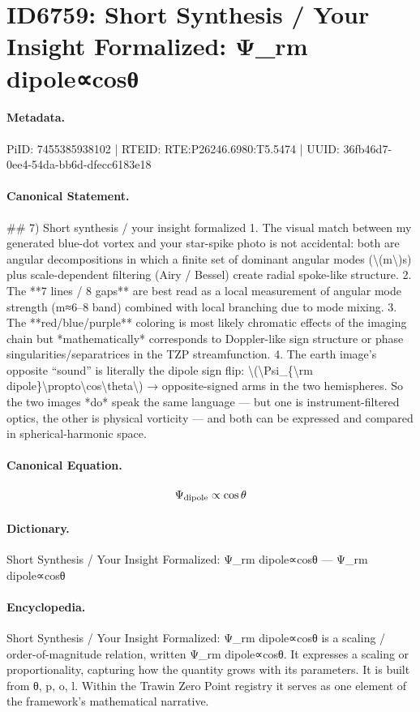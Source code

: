 \section*{ID6759: Short Synthesis / Your Insight Formalized: Ψ\_rm dipole∝cosθ}
\paragraph{Metadata.}
PiID: 7455385938102 | RTEID: RTE:P26246.6980:T5.5474 | UUID: 36fb46d7-0ee4-54da-bb6d-dfecc6183e18

\paragraph{Canonical Statement.}
\#\# 7) Short synthesis / your insight formalized 1. The visual match between my generated blue-dot vortex and your star-spike photo is not accidental: both are angular decompositions in which a finite set of dominant angular modes (\textbackslash{}(m\textbackslash{})s) plus scale-dependent filtering (Airy / Bessel) create radial spoke-like structure. 2. The **7 lines / 8 gaps** are best read as a local measurement of angular mode strength (m≈6–8 band) combined with local branching due to mode mixing. 3. The **red/blue/purple** coloring is most likely chromatic effects of the imaging chain but *mathematically* corresponds to Doppler-like sign structure or phase singularities/separatrices in the TZP streamfunction. 4. The earth image’s opposite “sound” is literally the dipole sign flip: \textbackslash{}(\textbackslash{}Psi\_\{\textbackslash{}rm dipole\}\textbackslash{}propto\textbackslash{}cos\textbackslash{}theta\textbackslash{}) → opposite-signed arms in the two hemispheres. So the two images *do* speak the same language — but one is instrument-filtered optics, the other is physical vorticity — and both can be expressed and compared in spherical-harmonic space.

\paragraph{Canonical Equation.}
\[
\Psi_{\rm dipole}\propto\cos\theta
\]

\paragraph{Dictionary.}
Short Synthesis / Your Insight Formalized: Ψ\_rm dipole∝cosθ — Ψ\_rm dipole∝cosθ

\paragraph{Encyclopedia.}
Short Synthesis / Your Insight Formalized: Ψ\_rm dipole∝cosθ is a scaling / order-of-magnitude relation, written Ψ\_rm dipole∝cosθ. It expresses a scaling or proportionality, capturing how the quantity grows with its parameters. It is built from θ, p, o, l. Within the Trawin Zero Point registry it serves as one element of the framework's mathematical narrative.

